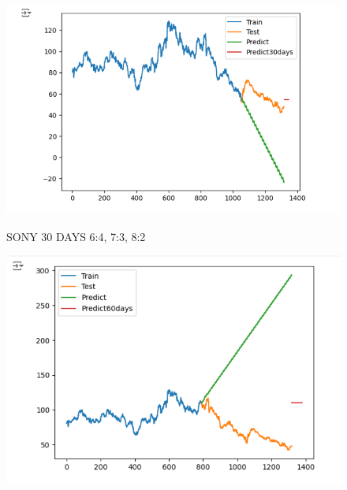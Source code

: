 \documentclass{article}
\begin{document}
\begin{multicols}{2}
\begin{figure}[H]
\begin{minipage}{0.15\textwidth}
    \label{fig:2}
    \end{minipage}%
    \begin{minipage}{0.15\textwidth}
    \centering
    \includegraphics[width=1\textwidth]{Image/ARIMA/30_8_2_SONY_Arima.png}

    \label{fig:3}
    \end{minipage}
    \caption{SONY 30 DAYS  6:4, 7:3, 8:2 }
\end{figure}

\begin{figure}[H]
    \centering
    \begin{minipage}{0.15\textwidth}
    \centering
    \includegraphics[width=1\textwidth]{Image/ARIMA/60_6_4_SONY_Arima.png}
   

\end{minipage}
\end{figure}
\end{multicols}
\end{document}
